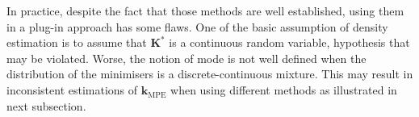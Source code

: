 \documentclass[preprint, review, 1p]{elsarticle}
\newcommand{\kmpe}{{\mathbf{k}}_{\mathrm{MPE}}}
\newcommand{\hatkmpe}{\hat{\mathbf{k}}_{\mathrm{MPE}}}
\newcommand{\elise}[1]{{\itshape\color{red} ({#1})}}
\newcommand{\victor}[1]{{\itshape\color{green} ({#1})}}
\begin{document}



In practice, despite the fact that those methods are well established, using them in a plug-in approach has some flaws. One of the basic assumption of density estimation is to assume that $\mathbf{K}^*$ is a continuous random variable, hypothesis that may be violated. Worse, the notion of mode is not well defined when the distribution of the minimisers is a discrete-continuous mixture. This may result in inconsistent 
estimations of $\hatkmpe$ when using different methods as illustrated in next subsection.



\end{document}
